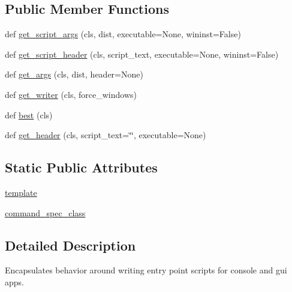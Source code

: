 \subsection*{Public Member Functions}
\begin{DoxyCompactItemize}
\item 
def \hyperlink{classsetuptools_1_1command_1_1easy__install_1_1ScriptWriter_aa7ead9e9848c94c2e7731fc34536b955}{get\+\_\+script\+\_\+args} (cls, dist, executable=None, wininst=False)
\item 
def \hyperlink{classsetuptools_1_1command_1_1easy__install_1_1ScriptWriter_af1af5f53d540528b220d31314786c7b7}{get\+\_\+script\+\_\+header} (cls, script\+\_\+text, executable=None, wininst=False)
\item 
def \hyperlink{classsetuptools_1_1command_1_1easy__install_1_1ScriptWriter_a5cbbc2c35ff56058a69d574cb10907a4}{get\+\_\+args} (cls, dist, header=None)
\item 
def \hyperlink{classsetuptools_1_1command_1_1easy__install_1_1ScriptWriter_a1faee20409374fa87b93b0ee9ed293db}{get\+\_\+writer} (cls, force\+\_\+windows)
\item 
def \hyperlink{classsetuptools_1_1command_1_1easy__install_1_1ScriptWriter_a1eae4e5243b93a8dd44ec91b0f4987f4}{best} (cls)
\item 
def \hyperlink{classsetuptools_1_1command_1_1easy__install_1_1ScriptWriter_ac83d10c941931452c67d870cb9a740a1}{get\+\_\+header} (cls, script\+\_\+text=\char`\"{}\char`\"{}, executable=None)
\end{DoxyCompactItemize}
\subsection*{Static Public Attributes}
\begin{DoxyCompactItemize}
\item 
\hyperlink{classsetuptools_1_1command_1_1easy__install_1_1ScriptWriter_add87ac1a8190275eb8e549a38aa3763b}{template}
\item 
\hyperlink{classsetuptools_1_1command_1_1easy__install_1_1ScriptWriter_ac4fc67e6673d774cd6af71b6eb982eb9}{command\+\_\+spec\+\_\+class}
\end{DoxyCompactItemize}


\subsection{Detailed Description}
\begin{DoxyVerb}Encapsulates behavior around writing entry point scripts for console and
gui apps.
\end{DoxyVerb}
 

